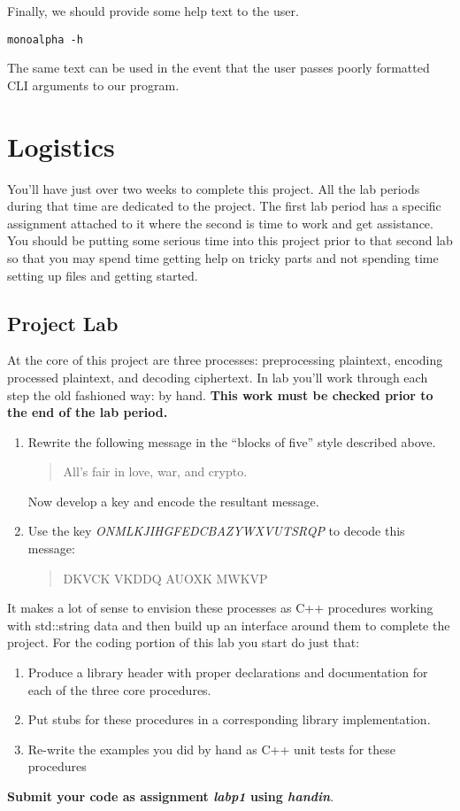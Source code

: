 \documentclass[]{tufte-handout}
\begin{document}
Finally, we should provide some help text to the user.
\begin{verbatim}
monoalpha -h
\end{verbatim}
The same text can be used in the event that the user passes poorly formatted CLI arguments to our program.


\section{Logistics}

You'll have just over two weeks to complete this project. All the lab periods during that time are dedicated to the project. The first lab period has a specific assignment attached to it where the second is time to work and get assistance. You should be putting some serious time into this project prior to that second lab so that you may spend time getting help on tricky parts and not spending time setting up files and getting started. 

\subsection{Project Lab}

At the core of this project are three processes: preprocessing plaintext, encoding processed plaintext, and decoding ciphertext. In lab you'll work through each step the old fashioned way: by hand. \textbf{This work must be checked prior to the end of the lab period.}
\begin{enumerate}
\item Rewrite the following message in the ``blocks of five'' style described above.
\begin{quote}
All's fair in love, war, and crypto.
\end{quote}
Now develop a key and encode the resultant message.
\item Use the key \textit{ONMLKJIHGFEDCBAZYWXVUTSRQP} to decode this message:
\begin{quote}
DKVCK VKDDQ AUOXK MWKVP
\end{quote}
\end{enumerate}


It makes a lot of sense to envision these processes as C++ procedures working with std::string data and then build up an interface around them to complete the project. For the coding portion of this lab you start do just that: 
\begin{enumerate}
\item Produce a library header with proper declarations and documentation for each of the three core procedures.
\item Put stubs for these procedures in a corresponding library implementation.
\item Re-write the examples you did by hand as C++ unit tests for these procedures 
\end{enumerate}
\textbf{Submit your code as assignment \textit{labp1} using \textit{handin}}.
\end{document}
